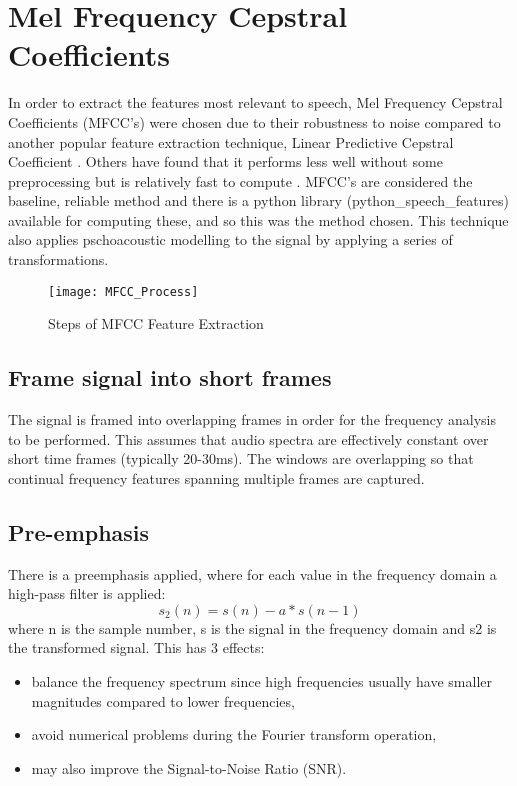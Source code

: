 
\section{Mel Frequency Cepstral Coefficients}

In order to extract the features most relevant to speech, Mel Frequency Cepstral Coefficients (MFCC’s) were chosen due to their robustness to noise compared to another popular feature extraction technique, Linear Predictive Cepstral Coefficient \cite{lpccvsmfcc}. Others have found that it performs less well without some preprocessing but is relatively fast to compute \cite{Shrawankar2013}. MFCC’s are considered the baseline, reliable method and there is a python library (python\_speech\_features) available for computing these, and so this was the method chosen.
This technique also applies pschoacoustic modelling to the signal by applying a series of transformations. 

\begin{figure}[h]
	\texttt{[image: MFCC\_Process]}
	\caption{Steps of MFCC Feature Extraction \cite{mfcc_steps}}
	\label{mfcc}
\end{figure}

\subsection{Frame signal into short frames}
The signal is framed into overlapping frames in order for the frequency analysis to be performed. This assumes that audio spectra are effectively constant over short time frames (typically 20-30ms). The windows are overlapping so that continual frequency features spanning multiple frames are captured.

\subsection{Pre-emphasis}
There is a preemphasis applied, where for each value in the frequency domain a high-pass filter is applied:
\begin{equation}
s_{2}(n) = s(n) - a*s(n-1) 
\end{equation}
where n is the sample number, s is the signal in the frequency domain and s2 is the transformed signal. 
This has 3 effects\cite{fayek_2016}:
\begin{itemize}
	\item balance the frequency spectrum since high frequencies usually have smaller magnitudes compared to lower frequencies,
	\item avoid numerical problems during the Fourier transform operation,
	\item may also improve the Signal-to-Noise Ratio (SNR).
\end{itemize}
